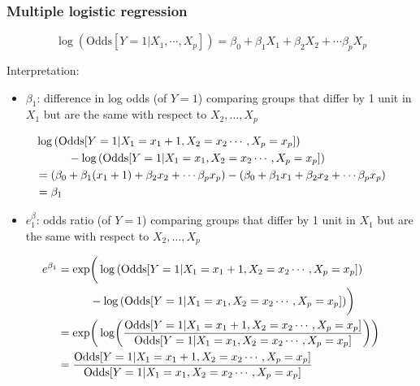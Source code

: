 \documentclass[10pt,t]{beamer}
\newcommand\tab[1][1cm]{\hspace*{#1}}
\begin{document}
\begin{frame}
	\frametitle{Multiple logistic regression}
	\vspace{-1.5cm}
	$$\log\left(\text{Odds}[Y =1 |X_1,\cdots,X_p]\right) = \beta_0 + \beta_1 X_1 + \beta_2X_2 + \cdots \beta_p X_p$$
	
	\color{blue} Interpretation: \color{black}
	\begin{itemize}   \color{red}
		\item $\beta_1$:   difference in log odds (of $Y=1$) comparing groups that differ by 1 unit in $X_1$ but are the same with respect to $X_2, \dots, X_p$  
	\end{itemize}
	\vspace{-0.3cm}
	\begin{footnotesize}
		\begin{align*}
			&\log\left(\text{Odds}[Y =1 |X_1=x_1+1,X_2 = x_2\cdots,X_p=x_p]\right) \\
			&\tab - \log\left(\text{Odds}[Y =1 |X_1=x_1,X_2 = x_2\cdots,X_p=x_p]\right) \\
			& = (\beta_0 + \beta_1(x_1+1) + \beta_2x_2 + \cdots \beta_px_p) - (\beta_0 + \beta_1x_1 + \beta_2x_2 + \cdots \beta_px_p) \\
			& = \beta_1
		\end{align*}
	\end{footnotesize} 
	\vspace{-0.3cm}
	\begin{itemize}\color{red}
			\item $e^\beta_1$:   odds ratio (of $Y = 1$) comparing groups that differ by 1 unit in $X_1$ but are the same with respect to $X_2,\dots, X_p$ 
	\end{itemize} 
\vspace{-0.3cm}
\begin{footnotesize}
\begin{align*}
	e^{\beta_1} &=\exp\biggr(\log\left(\text{Odds}[Y =1 |X_1=x_1+1,X_2 = x_2\cdots,X_p=x_p]\right) \\
	&\tab - \log\left(\text{Odds}[Y =1 |X_1=x_1,X_2 = x_2\cdots,X_p=x_p]\right)\biggr) \\
	&= \exp\biggr(\log\biggr(\frac{\text{Odds}[Y =1 |X_1=x_1+1,X_2 = x_2\cdots,X_p=x_p]}{\text{Odds}[Y =1 |X_1=x_1,X_2 = x_2\cdots,X_p=x_p]}\biggr)\biggr)\\
	& = \frac{\text{Odds}[Y =1 |X_1=x_1+1,X_2 = x_2\cdots,X_p=x_p]}{\text{Odds}[Y =1 |X_1=x_1,X_2 = x_2\cdots,X_p=x_p]}
\end{align*}
\end{footnotesize}
\end{frame}
\end{document}
